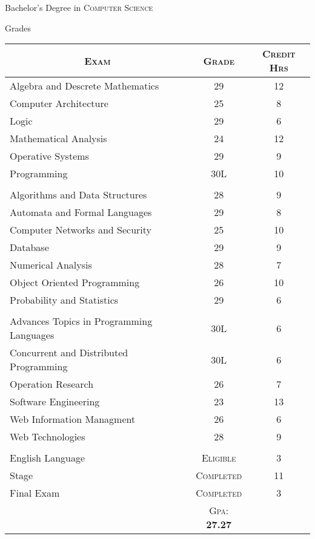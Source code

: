 \documentclass[a4paper,10pt]{article}
\begin{document}
\newpage
\par{\centering\Large \hypertarget{grds}{Bachelor's Degree in \textsc{Computer Science}} \par}\large{\centering Grades\par}\normalsize
\begin{center}
\begin{tabular}{lcc}
\multicolumn{1}{c}{\textsc{Exam}}&\textsc{Grade}&\textsc{Credit Hrs}\\ \hline
Algebra and Descrete Mathematics	&29& 12 \\
Computer Architecture	&25&	8\\
Logic	&29&	6\\
Mathematical Analysis	&24& 12\\
Operative Systems	&29&	9\\
Programming	&30L &	10\\ \\

Algorithms and Data Structures	&28 &	9\\
Automata and Formal Languages	& 29 &	8\\
Computer Networks and Security	&25	&10\\
Database	&29&	9\\
Numerical Analysis	&28&	7\\
Object Oriented Programming	& 26 &	10\\
Probability and Statistics	&29&	6\\ \\

Advances Topics in Programming Languages & 30L & 6 \\
Concurrent and Distributed Programming	& 30L &	6\\
Operation Research	&26&	7\\ 
Software Engineering & 23 &	13\\
Web Information Managment & 26 & 6 \\
Web Technologies & 28 & 9 \\ \\
English Language	& \textsc{Eligible} &	3\\
Stage	& \textsc{Completed}	& 11 \\
Final Exam	& \textsc{Completed}	& 3 \\	
		\cline{2-3}
	&\textsc{Gpa: } \textbf{27.27}
\end{tabular}
\end{center}
\end{document}
